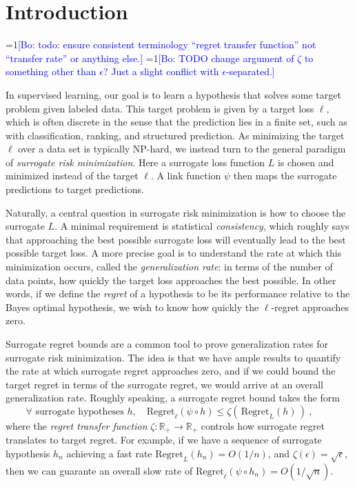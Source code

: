 \documentclass{article}
\theoremstyle{definition}\newtheorem{definition}{Definition}
\theoremstyle{definition}\newtheorem{assumption}{Assumption}
\newcommand{\Comments}{1}
\newcommand{\mynote}[2]{\ifnum\Comments=1\textcolor{#1}{#2}\fi}
\newcommand{\bo}[1]{\mynote{blue}{[Bo: #1]}}
\newcommand{\reals}{\mathbb{R}}
\newcommand{\Reg}{\mathrm{Regret}}
\begin{document}
\section{Introduction}
\bo{todo: ensure consistent terminology ``regret transfer function'' not ``transfer rate'' or anything else.}
\bo{TODO change argument of $\zeta$ to something other than $\epsilon$? Just a slight conflict with $\epsilon$-separated.}

In supervised learning, our goal is to learn a hypothesis that solves some target problem given labeled data.
This target problem is given by a target loss $\ell$, which is often discrete in the sense that the prediction lies in a finite set, such as with classification, ranking, and structured prediction.
As minimizing the target $\ell$ over a data set is typically NP-hard, we instead turn to the general paradigm of \emph{surrogate risk minimization}.
Here a surrogate loss function $L$ is chosen and minimized instead of the target $\ell$.
A link function $\psi$ then maps the surrogate predictions to target predictions.

Naturally, a central question in surrogate risk minimization is how to choose the surrogate $L$.
A minimal requirement is statistical \emph{consistency}, which roughly says that approaching the best possible surrogate loss will eventually lead to the best possible target loss.
A more precise goal is to understand the rate at which this minimization occurs, called the \emph{generalization rate}: in terms of the number of data points, how quickly the target loss approaches the best possible.
In other words, if we define the \emph{regret} of a hypothesis to be its performance relative to the Bayes optimal hypothesis, we wish to know how quickly the $\ell$-regret approaches zero.

Surrogate regret bounds are a common tool to prove generalization rates for surrogate risk minimization.
The idea is that we have ample results to quantify the rate at which surrogate regret approaches zero, and if we could bound the target regret in terms of the surrogate regret, we would arrive at an overall generalization rate.
Roughly speaking, a surrogate regret bound takes the form
\begin{equation}
  \label{eq:surrogate-regret-bound-informal}
  \forall \text{ surrogate hypotheses } h, \quad \Reg_\ell(\psi\circ h) \leq \zeta(\, \Reg_L(h) \,)~,\qquad
\end{equation}
where the \emph{regret transfer function} $\zeta : \reals_+ \to \reals_+$ controls how surrogate regret translates to target regret.
For example, if we have a sequence of surrogate hypothesis $h_n$ achieving a fast rate $\Reg_L(h_n) = O(1/n)$, and $\zeta(\epsilon) = \sqrt{\epsilon}$, then we can guarante an overall slow rate of $\Reg_\ell(\psi \circ h_n) = O(1/\sqrt{n})$.
\end{document}
